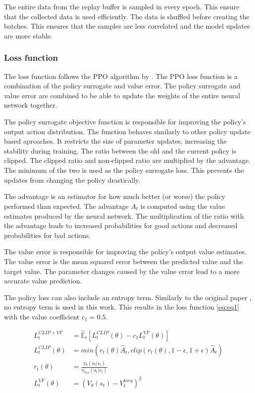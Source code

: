 The entire data from the replay buffer is sampled in every epoch. This ensure that the collected data is used efficiently. The data is shuffled before creating the batches. This ensures that the samples are less correlated and the model updates are more stable.

\subsubsection*{Loss function}

The loss function follows the \ac{PPO} algorithm by \textcite{ppo}. The PPO loss function is a combination of the policy surrogate and value error. The policy surrogate and value error are combined to be able to update the weights of the entire neural network together.

The policy surrogate objective function is responsible for improving the policy's output action distribution. The function behaves similarly to other policy update based aproaches. It restricts the size of parameter updates, increasing the stability during training. The ratio between the old and the current policy is clipped. The clipped ratio and non-clipped ratio are multiplied by the advantage. The minimum of the two is used as the policy surrogate loss. This prevents the updates from changing the policy drastically.

The advantage is an estimator for how much better (or worse) the policy performed than expected. The advantage $\hat{A}_t$ is computed using the value estimates produced by the neural network. The multiplication of the ratio with the advantage leads to increased probabilities for good actions and decreased probabilities for bad actions.

The value error is responsible for improving the policy's output value estimates. The value error is the mean squared error between the predicted value and the target value. The parameter changes caused by the value error lead to a more accurate value prediction.

The policy loss can also include an entropy term. Similarly to the original paper \textcite{ppo}, no entropy term is used in this work. This results in the loss function \eqref{eq:eq1} with the value coefficient $c_1 = 0.5$.

\begin{align*}
    L_t^{CLIP + VF} &= \hat{\mathbb{E}}_t [L_t^{CLIP}(\theta) - c_1 L_t^{VF}(\theta)] \label{eq:eq1}\tag{PPO Loss} \\
    L_t^{CLIP}(\theta) &= min(r_t(\theta)\hat{A}_t, clip(r_t(\theta), 1-\epsilon, 1+\epsilon)\hat{A}_t) \label{eq:eq2}\tag{Surrogate Objective}\\
    r_t(\theta) &= \frac{\pi_\theta(a_t|s_t)}{\pi_{\theta_{old}}(a_t|s_t)} \label{eq:eq3}\tag{Ratio}\\
    L_t^{VF}(\theta) &= (V_\theta (s_t) - V_t^{targ})^2 \label{eq:eq4}\tag{Value Error}
\end{align*}

